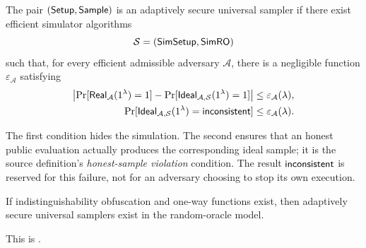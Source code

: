 \begin{definition}
\label{def:adaptive-universal-sampler}
The pair $(\mathsf{Setup},\mathsf{Sample})$ is an adaptively secure
universal sampler if there exist efficient simulator algorithms
\[
  \mathcal S=(\mathsf{SimSetup},\mathsf{SimRO})
\]
such that, for every
efficient admissible adversary $\mathcal A$, there is a negligible
function $\varepsilon_{\mathcal A}$ satisfying
\begin{align*}
  \left|\Pr[\mathsf{Real}_{\mathcal A}(1^\lambda)=1]
    -\Pr[\mathsf{Ideal}_{\mathcal A,\mathcal S}(1^\lambda)=1]\right|
    &\leq\varepsilon_{\mathcal A}(\lambda),\\
  \Pr[\mathsf{Ideal}_{\mathcal A,\mathcal S}(1^\lambda)
      =\mathsf{inconsistent}]
    &\leq\varepsilon_{\mathcal A}(\lambda).
\end{align*}
\end{definition}

The first condition hides the simulation.  The second ensures that an
honest public evaluation actually produces the corresponding ideal sample;
it is the source definition's \emph{honest-sample violation} condition.
The result $\mathsf{inconsistent}$ is reserved for this failure, not for
an adversary choosing to stop its own execution.

\begin{theorem}[Hofheinz et al.]
\label{thm:adaptive-universal-sampler}
If indistinguishability obfuscation and one-way functions exist, then
adaptively secure universal samplers exist in the random-oracle model.
\end{theorem}
This is \cite[full version, Theorem~3]{HofheinzEtAl2016UniversalSamplers}.
